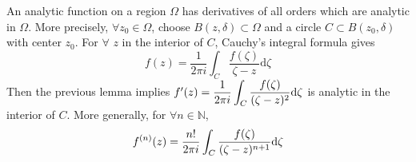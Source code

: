 \begin{theorem}
    An analytic function on a region  $ \Omega $ has derivatives of all orders which are analytic in  $ \Omega $. More precisely,  $ \forall z_0\in \Omega $, choose  $ B(z,\delta)\subset \Omega $ and a circle  $ C\subset B(z_0,\delta) $ with center  $ z_0 $. For  $ \forall  $  $ z $ in the interior of  $ C $, Cauchy's integral formula gives 
    \[f(z)=\frac{1}{2\pi i}\int_C\frac{f(\zeta)}{\zeta-z}\mathrm{d}\zeta\]     
    Then the previous lemma implies  $ f'(z)=\displaystyle\frac{1}{2\pi i}\int_C\frac{f(\zeta)}{(\zeta-z)^2}\mathrm{d}\zeta $ is analytic in the interior of  $ C $. More generally, for  $ \forall n\in \mathbb{N} $, 
    \begin{equation}
        f^{(n)}(z)=\displaystyle\frac{n!}{2\pi i}\int_C\frac{f(\zeta)}{(\zeta-z)^{n+1}}\mathrm{d}\zeta \label{Cauchy's Integral Formula for derivative vertion}
    \end{equation}
\end{theorem}
